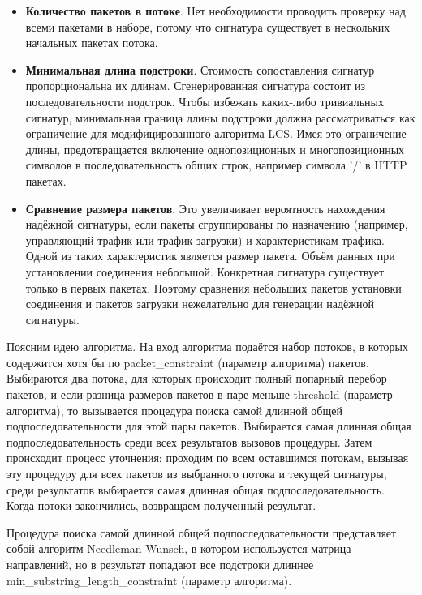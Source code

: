 \begin{itemize}
    \item \textbf{Количество пакетов в потоке}.
    Нет необходимости проводить проверку над всеми пакетами в наборе,
    потому что сигнатура существует в нескольких начальных пакетах потока.
    \item \textbf{Минимальная длина подстроки}. Стоимость сопоставления сигнатур пропорциональна их длинам.
    Сгенерированная сигнатура состоит из последовательности подстрок.
    Чтобы избежать каких-либо тривиальных сигнатур,
    минимальная граница длины подстроки должна рассматриваться как ограничение для модифицированного алгоритма LCS.
    Имея это ограничение длины, предотвращается включение однопозиционных и многопозиционных символов в последовательность общих строк,
    например символа '/' в HTTP пакетах.
    \item \textbf{Сравнение размера пакетов}. Это увеличивает вероятность нахождения надёжной сигнатуры,
    если пакеты сгруппированы по назначению (например, управляющий трафик или трафик загрузки) и характеристикам трафика.
    Одной из таких характеристик является размер пакета. Объём данных при установлении соединения небольшой.
    Конкретная сигнатура существует только в первых пакетах.
    Поэтому сравнения небольших пакетов установки соединения и пакетов загрузки нежелательно для генерации надёжной сигнатуры.

\end{itemize}

Поясним идею алгоритма. На вход алгоритма подаётся набор потоков, в которых содержится хотя бы по packet\_constraint
(параметр алгоритма) пакетов. Выбираются два потока, для которых происходит полный попарный перебор пакетов,
и если разница размеров пакетов в паре меньше threshold (параметр алгоритма),
то вызывается процедура поиска самой длинной общей подпоследовательности для этой пары пакетов.
Выбирается самая длинная общая подпоследовательность среди всех результатов вызовов процедуры.
Затем происходит процесс уточнения: проходим по всем оставшимся потокам, вызывая эту процедуру
для всех пакетов из выбранного потока и текущей сигнатуры,
среди результатов выбирается самая длинная общая подпоследовательность.
Когда потоки закончились, возвращаем полученный результат.

Процедура поиска самой длинной общей подпоследовательности представляет собой алгоритм Needleman-Wunsch, в котором используется матрица направлений,
но в результат попадают все подстроки длиннее min\_substring\_length\_constraint (параметр алгоритма).

